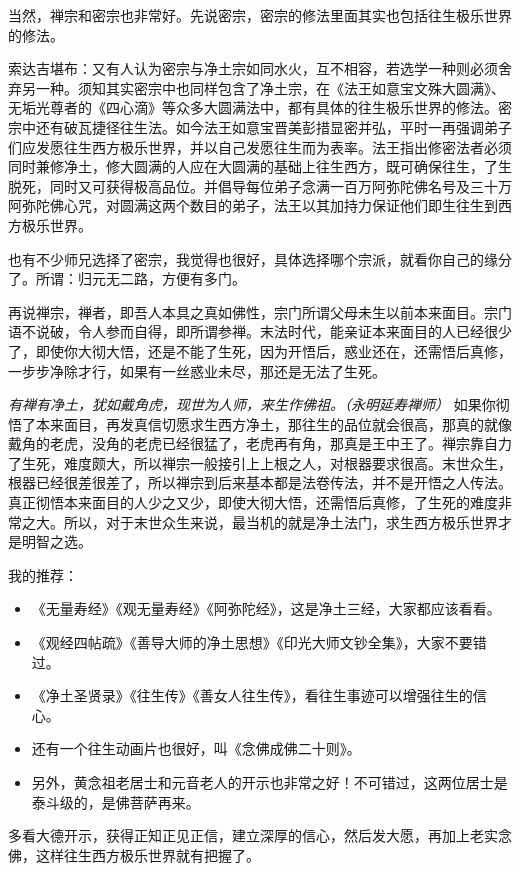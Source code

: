当然，禅宗和密宗也非常好。先说密宗，密宗的修法里面其实也包括往生极乐世界的修法。

索达吉堪布：又有人认为密宗与净土宗如同水火，互不相容，若选学一种则必须舍弃另一种。须知其实密宗中也同样包含了净土宗，在《法王如意宝文殊大圆满》、无垢光尊者的《四心滴》等众多大圆满法中，都有具体的往生极乐世界的修法。密宗中还有破瓦捷径往生法。如今法王如意宝晋美彭措显密并弘，平时一再强调弟子们应发愿往生西方极乐世界，并以自己发愿往生而为表率。法王指出修密法者必须同时兼修净土，修大圆满的人应在大圆满的基础上往生西方，既可确保往生，了生脱死，同时又可获得极高品位。并倡导每位弟子念满一百万阿弥陀佛名号及三十万阿弥陀佛心咒，对圆满这两个数目的弟子，法王以其加持力保证他们即生往生到西方极乐世界。

也有不少师兄选择了密宗，我觉得也很好，具体选择哪个宗派，就看你自己的缘分了。所谓：归元无二路，方便有多门。

再说禅宗，禅者，即吾人本具之真如佛性，宗门所谓父母未生以前本来面目。宗门语不说破，令人参而自得，即所谓参禅。末法时代，能亲证本来面目的人已经很少了，即使你大彻大悟，还是不能了生死，因为开悟后，惑业还在，还需悟后真修，一步步净除才行，如果有一丝惑业未尽，那还是无法了生死。

\textit{有禅有净土，犹如戴角虎，现世为人师，来生作佛祖。（永明延寿禅师）} 如果你彻悟了本来面目，再发真信切愿求生西方净土，那往生的品位就会很高，那真的就像戴角的老虎，没角的老虎已经很猛了，老虎再有角，那真是王中王了。禅宗靠自力了生死，难度颇大，所以禅宗一般接引上上根之人，对根器要求很高。末世众生，根器已经很差很差了，所以禅宗到后来基本都是法卷传法，并不是开悟之人传法。真正彻悟本来面目的人少之又少，即使大彻大悟，还需悟后真修，了生死的难度非常之大。所以，对于末世众生来说，最当机的就是净土法门，求生西方极乐世界才是明智之选。

我的推荐：

\begin{itemize}
    \item 《无量寿经》《观无量寿经》《阿弥陀经》，这是净土三经，大家都应该看看。
    \item 《观经四帖疏》《善导大师的净土思想》《印光大师文钞全集》，大家不要错过。
    \item 《净土圣贤录》《往生传》《善女人往生传》，看往生事迹可以增强往生的信心。
    \item 还有一个往生动画片也很好，叫《念佛成佛二十则》。
    \item 另外，黄念祖老居士和元音老人的开示也非常之好！不可错过，这两位居士是泰斗级的，是佛菩萨再来。
\end{itemize}

多看大德开示，获得正知正见正信，建立深厚的信心，然后发大愿，再加上老实念佛，这样往生西方极乐世界就有把握了。

